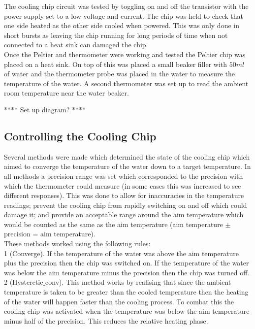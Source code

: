 \documentclass[10pt]{article}
\begin{document}
The cooling chip circuit was tested by toggling on and off the transistor with the power supply set to a low voltage and current. The chip was held to check that one side heated as the other side cooled when powered. This was only done in short bursts as leaving the chip running for long periods of time when not connected to a heat sink can damaged the chip. \\

Once the Peltier and thermometer were working and tested the Peltier chip was placed on a heat sink. On top of this was placed a small beaker filler with $50ml$ of water and the thermometer probe was placed in the water to measure the temperature of the water. A second thermometer was set up to read the ambient room temperature near the water beaker.


**** Set up diagram? ****

\subsection*{Controlling the Cooling Chip}
Several methods were made which determined the state of the cooling chip which aimed to converge the temperature of the water down to a target temperature. In all methods a precision range was set which corresponded to the precision with which the thermometer could measure (in some cases this was increased to see different responses). This was done to allow for inaccuracies in the temperature readings; prevent the cooling chip from rapidly switching on and off which could damage it; and provide an acceptable range around the aim temperature which would be counted as the same as the aim temperature (aim temperature $\pm$ precision = aim temperature).\\

These methods worked using the following rules:\\ %

1 (Converge). If the temperature of the water was above the aim temperature plus the precision then the chip was switched on. If the temperature of the water was below the aim temperature minus the precision then the chip was turned off.\\

2 (Hysteretic$\_$conv). This method works by realising that since the ambient temperature is taken to be greater than the cooled temperature then the heating of the water will happen faster than the cooling process. To combat this the cooling chip was activated when the temperature was below the aim temperature minus half of the precision. This reduces the relative heating phase.\\
\end{document}
